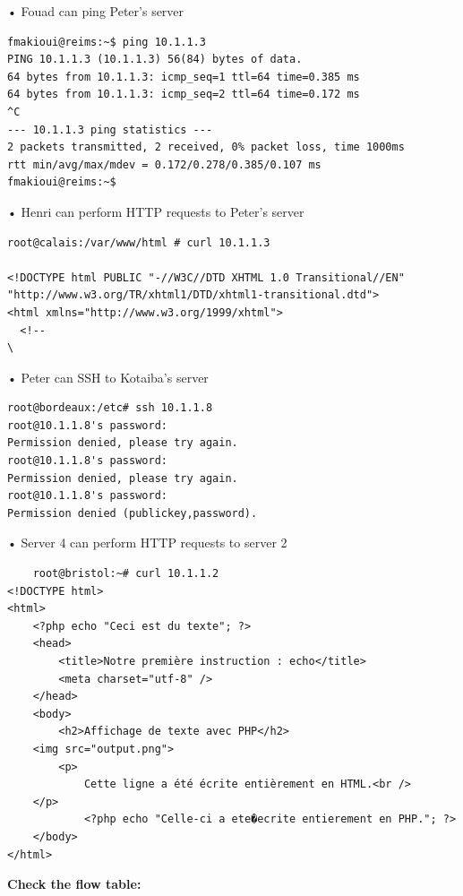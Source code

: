 \documentclass[a4paper]{article}
\begin{document}
• Fouad can ping Peter's server 
\begin{verbatim}
fmakioui@reims:~$ ping 10.1.1.3
PING 10.1.1.3 (10.1.1.3) 56(84) bytes of data.
64 bytes from 10.1.1.3: icmp_seq=1 ttl=64 time=0.385 ms
64 bytes from 10.1.1.3: icmp_seq=2 ttl=64 time=0.172 ms
^C
--- 10.1.1.3 ping statistics ---
2 packets transmitted, 2 received, 0% packet loss, time 1000ms
rtt min/avg/max/mdev = 0.172/0.278/0.385/0.107 ms
fmakioui@reims:~$ 
\end{verbatim}


• Henri can perform HTTP requests to Peter's server
\begin{verbatim}
root@calais:/var/www/html # curl 10.1.1.3

<!DOCTYPE html PUBLIC "-//W3C//DTD XHTML 1.0 Transitional//EN" "http://www.w3.org/TR/xhtml1/DTD/xhtml1-transitional.dtd">
<html xmlns="http://www.w3.org/1999/xhtml">
  <!--
\
\end{verbatim}


• Peter can SSH to Kotaiba's server
\begin{verbatim}
root@bordeaux:/etc# ssh 10.1.1.8
root@10.1.1.8's password: 
Permission denied, please try again.
root@10.1.1.8's password: 
Permission denied, please try again.
root@10.1.1.8's password: 
Permission denied (publickey,password).
\end{verbatim}



• Server 4 can perform HTTP requests to server 2
\begin{verbatim}
    root@bristol:~# curl 10.1.1.2
<!DOCTYPE html>
<html>
	<?php echo "Ceci est du texte"; ?>
    <head>
        <title>Notre première instruction : echo</title>
        <meta charset="utf-8" />
    </head>
    <body>
        <h2>Affichage de texte avec PHP</h2>
	<img src="output.png">        
        <p>
            Cette ligne a été écrite entièrement en HTML.<br />
	</p>
            <?php echo "Celle-ci a ete�ecrite entierement en PHP."; ?>
    </body>
</html>
\end{verbatim}


\textbf{Check the flow table:}
\end{document}
